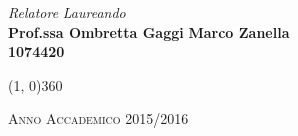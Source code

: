 \begin{titlepage}
\vfill
\begin{normalsize}
\begin{flushleft}
  \hspace{30pt} \textit{Relatore} \hspace{200pt} \textit{Laureando}\\
  \vspace{5pt}
  \hspace{30pt} \large{\textbf{Prof.ssa Ombretta Gaggi}} \hspace{70pt} \large{\textbf{Marco Zanella}}\\
  \hspace{284pt} \large{\textbf{1074420}}
  \vspace{10pt}
\end{flushleft}
\end{normalsize}

\vfill
\begin{center}
\hspace{-0.2cm}
\line(1, 0){360}

\textsc{Anno Accademico 2015/2016}
\end{center}
\end{titlepage}